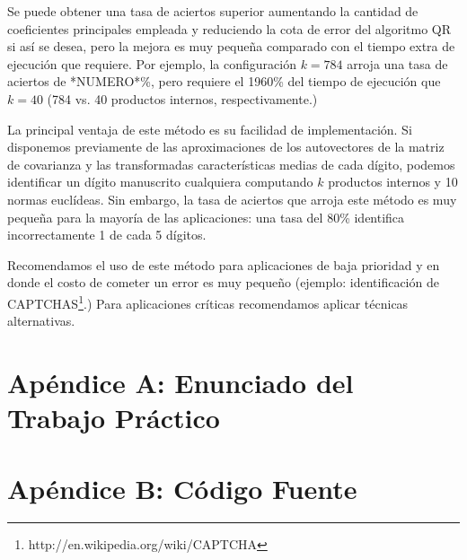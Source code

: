 \documentclass[a4paper,10pt,twoside]{article}
\begin{document}
Se puede obtener una tasa de aciertos superior aumentando la cantidad de coeficientes principales empleada y reduciendo la cota de error del algoritmo QR si así se desea, pero la mejora es muy pequeña comparado con el tiempo extra de ejecución que requiere. Por ejemplo, la configuración $k = 784$ arroja una tasa de aciertos de *NUMERO*\%, pero requiere el 1960\% del tiempo de ejecución que $k = 40$ (784 vs. 40 productos internos, respectivamente.)

La principal ventaja de este método es su facilidad de implementación. Si disponemos previamente de las aproximaciones de los autovectores de la matriz de covarianza y las transformadas características medias de cada dígito, podemos identificar un dígito manuscrito cualquiera computando $k$ productos internos y 10 normas euclídeas. Sin embargo, la tasa de aciertos que arroja este método es muy pequeña para la mayoría de las aplicaciones: una tasa del 80\% identifica incorrectamente 1 de cada 5 dígitos.

Recomendamos el uso de este método para aplicaciones de baja prioridad y en donde el costo de cometer un error es muy pequeño (ejemplo: identificación de CAPTCHAS\footnote{http://en.wikipedia.org/wiki/CAPTCHA}.) Para aplicaciones críticas recomendamos aplicar técnicas alternativas.




\newpage

\section{Apéndice A: Enunciado del Trabajo Práctico}





\newpage

\section{Apéndice B: Código Fuente}


\end{document}
